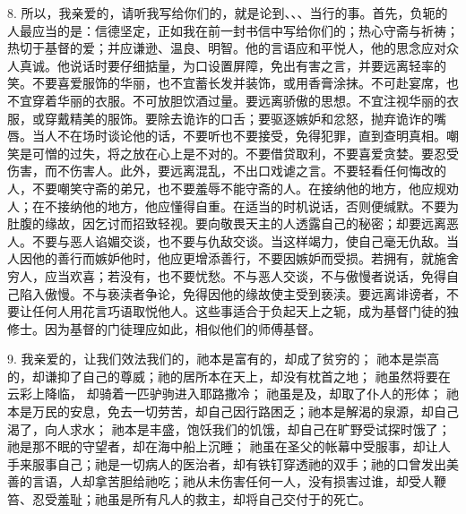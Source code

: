8. 所以，我亲爱的，请听我写给你们的，就是论到、、、当行的事。首先，负轭的人最应当的是：信德坚定，正如我在前一封书信中写给你们的；热心守斋与祈祷；热切于基督的爱；并应谦逊、温良、明智。他的言语应和平悦人，他的思念应对众人真诚。他说话时要仔细掂量，为口设置屏障，免出有害之言，并要远离轻率的笑。不要喜爱服饰的华丽，也不宜蓄长发并装饰，或用香膏涂抹。不可赴宴席，也不宜穿着华丽的衣服。不可放胆饮酒过量。要远离骄傲的思想。不宜注视华丽的衣服，或穿戴精美的服饰。要除去诡诈的口舌；要驱逐嫉妒和忿怒，抛弃诡诈的嘴唇。当人不在场时谈论他的话，不要听也不要接受，免得犯罪，直到查明真相。嘲笑是可憎的过失，将之放在心上是不对的。不要借贷取利，不要喜爱贪婪。要忍受伤害，而不伤害人。此外，要远离混乱，不出口戏谑之言。不要轻看任何悔改的人，不要嘲笑守斋的弟兄，也不要羞辱不能守斋的人。在接纳他的地方，他应规劝人；在不接纳他的地方，他应懂得自重。在适当的时机说话，否则便缄默。不要为肚腹的缘故，因乞讨而招致轻视。要向敬畏天主的人透露自己的秘密；却要远离恶人。不要与恶人谄媚交谈，也不要与仇敌交谈。当这样竭力，使自己毫无仇敌。当人因他的善行而嫉妒他时，他应更增添善行，不要因嫉妒而受损。若拥有，就施舍穷人，应当欢喜；若没有，也不要忧愁。不与恶人交谈，不与傲慢者说话，免得自己陷入傲慢。不与亵渎者争论，免得因他的缘故使主受到亵渎。要远离诽谤者，不要让任何人用花言巧语取悦他人。这些事适合于负起天上之轭，成为基督门徒的独修士。因为基督的门徒理应如此，相似他们的师傅基督。\par

9. 我亲爱的，让我们效法我们的，祂本是富有的，却成了贫穷的； 祂本是崇高的，却谦抑了自己的尊威；祂的居所本在天上，却没有枕首之地； 祂虽然将要在云彩上降临， 却骑着一匹驴驹进入耶路撒冷； 祂虽是及，却取了仆人的形体； 祂本是万民的安息，免去一切劳苦，却自己因行路困乏；祂本是解渴的泉源，却自己渴了，向人求水； 祂本是丰盛，饱饫我们的饥饿，却自己在旷野受试探时饿了； 祂是那不眠的守望者，却在海中船上沉睡； 祂虽在圣父的帐幕中受服事，却让人手来服事自己；祂是一切病人的医治者，却有铁钉穿透祂的双手；祂的口曾发出美善的言语，人却拿苦胆给祂吃；祂从未伤害任何一人，没有损害过谁，却受人鞭笞、忍受羞耻；祂虽是所有凡人的救主，却将自己交付于的死亡。\par


